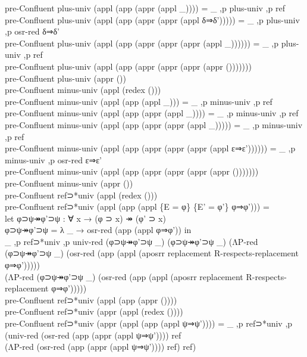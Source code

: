 {\begin{code}
{\>pre-Confluent plus-univ (appl (app (appr (appl \_)))) = \_ ,p plus-univ ,p ref\<\\
\>pre-Confluent plus-univ (appl (app (appr (appr (appl δ⇒δ'))))) = \_ ,p plus-univ ,p osr-red δ⇒δ'\<\\
\>pre-Confluent plus-univ (appl (app (appr (appr (appr (appl \_)))))) = \_ ,p plus-univ ,p ref\<\\
\>pre-Confluent plus-univ (appl (app (appr (appr (appr (appr ()))))))\<\\
\>pre-Confluent plus-univ (appr ())\<\\
\>pre-Confluent minus-univ (appl (redex ()))\<\\
\>pre-Confluent minus-univ (appl (app (appl \_))) = \_ ,p minus-univ ,p ref\<\\
\>pre-Confluent minus-univ (appl (app (appr (appl \_)))) = \_ ,p minus-univ ,p ref\<\\
\>pre-Confluent minus-univ (appl (app (appr (appr (appl \_))))) = \_ ,p minus-univ ,p ref\<\\
\>pre-Confluent minus-univ (appl (app (appr (appr (appr (appl ε⇒ε')))))) = \_ ,p minus-univ ,p osr-red ε⇒ε'\<\\
\>pre-Confluent minus-univ (appl (app (appr (appr (appr (appr ()))))))\<\\
\>pre-Confluent minus-univ (appr ())\<\\
\>pre-Confluent ref⊃*univ (appl (redex ()))\<\\
\>pre-Confluent ref⊃*univ (appl (app (appl \{E = φ\} \{E' = φ'\} φ⇒φ'))) = \<\\
\>  let φ⊃ψ↠φ'⊃ψ : ∀ x → (φ ⊃ x) ↠ (φ' ⊃ x)\<\\
\>      φ⊃ψ↠φ'⊃ψ = λ \_ → osr-red (app (appl φ⇒φ')) in\<\\
\>  \_ ,p ref⊃*univ ,p univ-red (φ⊃ψ↠φ'⊃ψ \_) (φ⊃ψ↠φ'⊃ψ \_) (ΛP-red (φ⊃ψ↠φ'⊃ψ \_) (osr-red (app (appl (aposrr replacement R-respects-replacement φ⇒φ'))))) \<\\
\>  (ΛP-red (φ⊃ψ↠φ'⊃ψ \_) (osr-red (app (appl (aposrr replacement R-respects-replacement φ⇒φ')))))\<\\
\>pre-Confluent ref⊃*univ (appl (app (appr ())))\<\\
\>pre-Confluent ref⊃*univ (appr (appl (redex ())))\<\\
\>pre-Confluent ref⊃*univ (appr (appl (app (appl ψ⇒ψ')))) = \_ ,p ref⊃*univ ,p (univ-red (osr-red (app (appr (appl ψ⇒ψ')))) ref \<\\
\>  (ΛP-red (osr-red (app (appr (appl ψ⇒ψ')))) ref) ref)\<\\
}
\end{code}}
